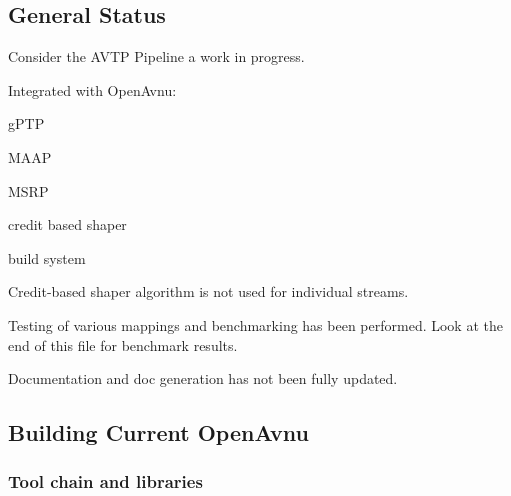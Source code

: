 \subsection*{General Status}


\begin{DoxyItemize}
\item Consider the A\+V\+TP Pipeline a work in progress.
\item Integrated with Open\+Avnu\+:
\begin{DoxyItemize}
\item g\+P\+TP
\item M\+A\+AP
\item M\+S\+RP
\item credit based shaper
\item build system
\end{DoxyItemize}
\item Credit-\/based shaper algorithm is not used for individual streams.
\item Testing of various mappings and benchmarking has been performed. Look at the end of this file for benchmark results.
\item Documentation and doc generation has not been fully updated.
\end{DoxyItemize}

\subsection*{Building Current Open\+Avnu}

\subsubsection*{Tool chain and libraries}


